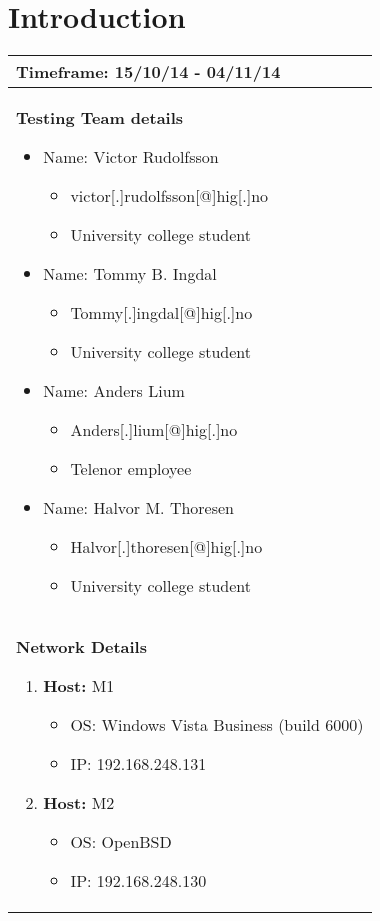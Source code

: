 \section{Introduction}

\begin{longtable}{|p{16.5cm}|}
\hline
\textbf{Timeframe:} 15/10/14 - 04/11/14  \\ \hline
\textbf{Testing Team details }
\begin{itemize}
	\item Name: Victor Rudolfsson
	\begin{itemize}
		\item victor[.]rudolfsson[@]hig[.]no
		\item University college student
	\end{itemize}
	\item Name: Tommy B. Ingdal
	\begin{itemize}
		\item Tommy[.]ingdal[@]hig[.]no
		\item University college student
	\end{itemize}
	\item Name: Anders Lium
	\begin{itemize}
		\item Anders[.]lium[@]hig[.]no
		\item Telenor employee
	\end{itemize}
	\item Name: Halvor M. Thoresen
	\begin{itemize}
		\item Halvor[.]thoresen[@]hig[.]no
		\item University college student
	\end{itemize}
\end{itemize}
\\ \hline
\textbf{Network Details }
\begin{enumerate}
	\item \textbf{Host:} M1
		\begin{itemize}
			\item OS: Windows Vista Business (build 6000)
			\item IP: 192.168.248.131
		\end{itemize}
	\item \textbf{Host:} M2
		\begin{itemize}
			\item OS: OpenBSD
			\item IP: 192.168.248.130
		\end{itemize}

\end{enumerate}
\end{longtable}
